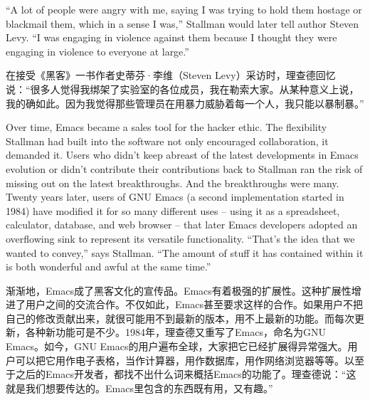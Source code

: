 \ifdefined\eng
``A lot of people were angry with me, saying I was trying to hold them hostage or blackmail them, which in a sense I was,'' Stallman would later tell author Steven Levy. ``I was engaging in violence against them because I thought they were engaging in violence to everyone at large.''
\fi

\ifdefined\chs
在接受《黑客》一书作者史蒂芬·李维（Steven Levy）采访时，理查德回忆说：“很多人觉得我绑架了实验室的各位成员，我在勒索大家。从某种意义上说，我的确如此。因为我觉得那些管理员在用暴力威胁着每一个人，我只能以暴制暴。”
\fi

\ifdefined\eng
Over time, Emacs became a sales tool for the hacker ethic. The flexibility Stallman had built into the software not only encouraged collaboration, it demanded it. Users who didn't keep abreast of the latest developments in Emacs evolution or didn't contribute their contributions back to Stallman ran the risk of missing out on the latest breakthroughs. And the breakthroughs were many. Twenty years later, users of GNU Emacs (a second implementation started in 1984) have modified it for so many different uses -- using it as a spreadsheet, calculator, database, and web browser -- that later Emacs developers adopted an overflowing sink to represent its versatile functionality. ``That's the idea that we wanted to convey,'' says Stallman. ``The amount of stuff it has contained within it is both wonderful and awful at the same time.''
\fi

\ifdefined\chs
渐渐地，Emacs成了黑客文化的宣传品。Emacs有着极强的扩展性。这种扩展性增进了用户之间的交流合作。不仅如此，Emacs甚至要求这样的合作。如果用户不把自己的修改贡献出来，就很可能用不到最新的版本，用不上最新的功能。而每次更新，各种新功能可是不少。1984年，理查德又重写了Emacs，命名为GNU Emacs。如今，GNU Emacs的用户遍布全球，大家把它已经扩展得异常强大。用户可以把它用作电子表格，当作计算器，用作数据库，用作网络浏览器等等。以至于之后的Emacs开发者，都找不出什么词来概括Emacs的功能了。理查德说：“这就是我们想要传达的。Emacs里包含的东西既有用，又有趣。”
\fi

